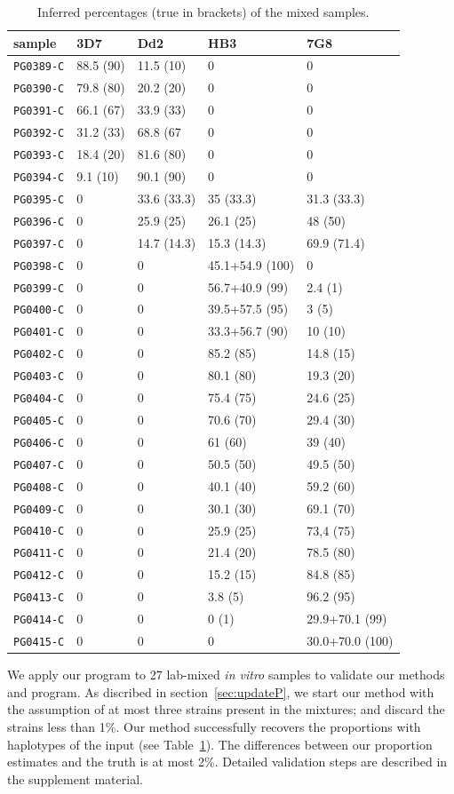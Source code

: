 \documentclass{bioinfo}
\begin{document}
\begin{methods}
\begin{table}[ht]\centering
\begin{tabular}[c]{@{}l|llll@{}}\hline
sample    & 3D7 & Dd2 & HB3 & 7G8 \\ \hline
{\tt	PG0389-C}	&	88.5	(90)	&	11.5	(10)	&		0	&		0	\tabularnewline
{\tt	PG0390-C}	&	79.8	(80)	&	20.2	(20)	&		0	&		0	\tabularnewline
{\tt	PG0391-C}	&	66.1	(67)	&	33.9	(33)	&		0	&		0	\tabularnewline
{\tt	PG0392-C}	&	31.2	(33)	&	68.8	(67	&		0	&		0	\tabularnewline
{\tt	PG0393-C}	&	18.4	(20)	&	81.6	(80)	&		0	&		0	\tabularnewline
{\tt	PG0394-C}	&	9.1	(10)	&	90.1	(90)	&		0	&		0	\tabularnewline
{\tt	PG0395-C}	&		0	&	33.6	(33.3)	&	35	(33.3)	&	31.3	(33.3)	\tabularnewline
{\tt	PG0396-C}	&		0	&	25.9	(25)	&	26.1	(25)	&	48	(50)	\tabularnewline
{\tt	PG0397-C}	&		0	&	14.7	(14.3)	&	15.3	(14.3)	&	69.9	(71.4)	\tabularnewline
{\tt	PG0398-C}	&		0	&		0	&	45.1+54.9	(100)	&		0	\tabularnewline
{\tt	PG0399-C}	&		0	&		0	&	56.7+40.9	(99)	&	2.4	(1)	\tabularnewline
{\tt	PG0400-C}	&		0	&		0	&	39.5+57.5	(95)	&	3	(5)	\tabularnewline
{\tt	PG0401-C}	&		0	&		0	&	33.3+56.7	(90)	&	10	(10)	\tabularnewline
{\tt	PG0402-C}	&		0	&		0	&	85.2	(85)	&	14.8	(15)	\tabularnewline
{\tt	PG0403-C}	&		0	&		0	&	80.1	(80)	&	19.3	(20)	\tabularnewline
{\tt	PG0404-C}	&		0	&		0	&	75.4	(75)	&	24.6	(25)	\tabularnewline
{\tt	PG0405-C}	&		0	&		0	&	70.6	(70)	&	29.4	(30)	\tabularnewline
{\tt	PG0406-C}	&		0	&		0	&	61	(60)	&	39	(40)	\tabularnewline
{\tt	PG0407-C}	&		0	&		0	&	50.5	(50)	&	49.5	(50)	\tabularnewline
{\tt	PG0408-C}	&		0	&		0	&	40.1	(40)	&	59.2	(60)	\tabularnewline
{\tt	PG0409-C}	&		0	&		0	&	30.1	(30)	&	69.1	(70)	\tabularnewline
{\tt	PG0410-C}	&		0	&		0	&	25.9	(25)	&	73,4	(75)	\tabularnewline
{\tt	PG0411-C}	&		0	&		0	&	21.4	(20)	&	78.5	(80)	\tabularnewline
{\tt	PG0412-C}	&		0	&		0	&	15.2	(15)	&	84.8	(85)	\tabularnewline
{\tt	PG0413-C}	&		0	&		0	&	3.8	(5)	&	96.2	(95)	\tabularnewline
{\tt	PG0414-C}	&		0	&		0	&	0	(1)	&	29.9+70.1	(99)	\tabularnewline
{\tt	PG0415-C}	&		0	&		0	&		0	&	30.0+70.0	(100)	\tabularnewline
\hline
\end{tabular}
\caption{Inferred percentages (true in brackets) of the mixed samples.}
\label{tab:jason}
\end{table}

We apply our program to 27 lab-mixed {\em in vitro} samples to validate our methods and program. As discribed in section~\ref{sec:updateP}, we start our method with the assumption of at most three strains present in the mixtures; and discard the strains less than 1\%. Our method successfully recovers the proportions with haplotypes of the input (see Table~\ref{tab:jason}). The differences between our proportion estimates and the truth is at most 2\%. Detailed validation steps are described in the supplement material.


\end{methods}
\end{document}
